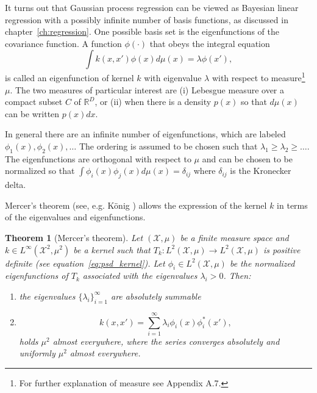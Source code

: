 \documentclass[11pt]{book}
\newtheorem{theorem}{Theorem}[chapter]
\begin{document}
It turns out that Gaussian process regression can be viewed as Bayesian linear regression with a possibly infinite number of basis functions, as discussed in chapter~\ref{ch:regression}. One possible basis set is the eigenfunctions of the covariance function. A function $\phi(\cdot)$ that obeys the integral equation
\begin{equation}
\label{eq:eigenfunction_equation}
\int k(x, x') \phi(x) d\mu(x) = \lambda \phi(x'),
\end{equation}
is called an eigenfunction of kernel $k$ with eigenvalue $\lambda$ with respect to measure\footnote{For further explanation of measure see Appendix A.7.} $\mu$. The two measures of particular interest are (i) Lebesgue measure over a compact subset $C$ of $\mathbb{R}^D$, or (ii) when there is a density $p(x)$ so that $d\mu(x)$ can be written $p(x)dx$.

In general there are an infinite number of eigenfunctions, which are labeled $\phi_1(x), \phi_2(x), \ldots$ The ordering is assumed to be chosen such that $\lambda_1 \geq \lambda_2 \geq \ldots$. The eigenfunctions are orthogonal with respect to $\mu$ and can be chosen to be normalized so that $\int \phi_i(x) \phi_j(x) d\mu(x) = \delta_{ij}$ where $\delta_{ij}$ is the Kronecker delta.

Mercer's theorem (see, e.g. König \cite{konig1986}) allows the expression of the kernel $k$ in terms of the eigenvalues and eigenfunctions.

\begin{theorem}[Mercer's theorem]
\label{thm:mercer}
Let $(\mathcal{X}, \mu)$ be a finite measure space and $k \in L^\infty(\mathcal{X}^2, \mu^2)$ be a kernel such that $T_k : L^2(\mathcal{X}, \mu) \to L^2(\mathcal{X}, \mu)$ is positive definite (see equation~\eqref{eq:psd_kernel}). Let $\phi_i \in L^2(\mathcal{X}, \mu)$ be the normalized eigenfunctions of $T_k$ associated with the eigenvalues $\lambda_i > 0$. Then:
\begin{enumerate}
\item the eigenvalues $\{\lambda_i\}_{i=1}^\infty$ are absolutely summable
\item 
\begin{equation}
\label{eq:mercer_expansion}
k(x, x') = \sum_{i=1}^\infty \lambda_i \phi_i(x) \phi_i^*(x'),
\end{equation}
holds $\mu^2$ almost everywhere, where the series converges absolutely and uniformly $\mu^2$ almost everywhere.
\end{enumerate}
\end{theorem}
\end{document}
